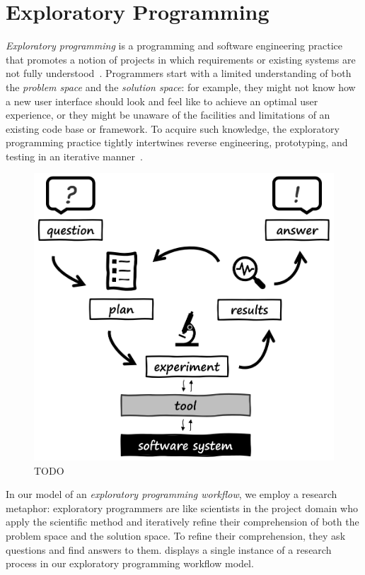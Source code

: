 
\section{Exploratory Programming}
\label{sec:background/exp}

\emph{Exploratory programming} is a programming and software engineering practice that promotes a notion of projects in which requirements or existing systems are not fully understood~\cite{sandberg1988smalltalk,kery2017exploring,rein2018exploratory}.
Programmers start with a limited understanding of both the \emph{problem space} and the \emph{solution space}:
for example, they might not know how a new user interface should look and feel like to achieve an optimal user experience, or they might be unaware of the facilities and limitations of an existing code base or framework.
To acquire such knowledge, the exploratory programming practice tightly intertwines reverse engineering, prototyping, and testing in an iterative manner~\cite{taeumel2022pattern}.

\begin{figure}
	\centering
	\includegraphics[draft]{01_exp/simple_process}
	\caption[TODO]{TODO}
	\label{fig:background/exp/simple_process}
\end{figure}

In our model of an \emph{exploratory programming workflow}, we employ a research metaphor:
exploratory programmers are like scientists in the project domain who apply the scientific method and iteratively refine their comprehension of both the problem space and the solution space.
To refine their comprehension, they ask questions and find answers to them.
 displays a single instance of a research process in our exploratory programming workflow model.

